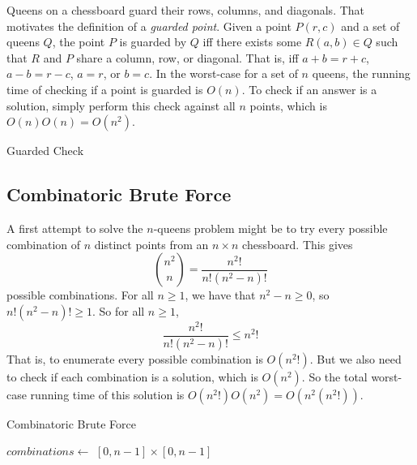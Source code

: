 \documentclass{article}
\begin{document}
Queens on a chessboard guard their rows, columns, and diagonals. That motivates
the definition of a \textit{guarded point}. Given a point $P(r, c)$ and a set
of queens $Q$, the point $P$ is guarded by $Q$ iff there exists some $R(a, b)
\in Q$ such that $R$ and $P$ share a column, row, or diagonal. That is, iff $a
+ b = r + c$, $a - b = r - c$, $a = r$, or $b = c$. In the worst-case for a set
of $n$ queens, the running time of checking if a point is guarded is $O(n)$. To
check if an answer is a solution, simply perform this check against all $n$
points, which is $O(n)O(n) = O(n^2)$.

\begin{algorithm}
    \caption{Guarded Check}


    \;
\end{algorithm}

\subsection*{Combinatoric Brute Force}
\label{sub:combinatoric_brute_force}

A first attempt to solve the $n$-queens problem might be to try every possible
combination of $n$ distinct points from an $n \times n$ chessboard. This gives
$${n^2 \choose n} = \frac{n^2!}{n!(n^2 - n)!}$$ possible combinations. For all
$n \geq 1$, we have that $n^2 - n \geq 0$, so $n!(n^2 - n)! \geq 1$. So for all
$n \geq 1$, $$\frac{n^2!}{n!(n^2 - n)!} \leq n^2!$$ That is, to enumerate every
possible combination is $O(n^2!)$. But we also need to check if each combination
is a solution, which is $O(n^2)$. So the total worst-case running time of this
solution is $O(n^2!)O(n^2) = O(n^2(n^2!))$.

\begin{algorithm}
    \caption{Combinatoric Brute Force}

    $combinations \leftarrow$ $[0, n-1] \times [0, n-1]$\;
\end{algorithm}
\end{document}
